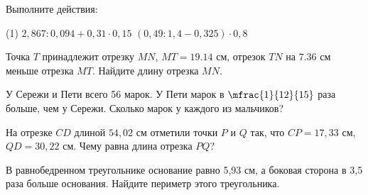 \begin{homework}[number=2]
	\begin{listofex}
		\item Выполните действия: \begin{tasks}(1)
			\task \( 2,867:0,094+0,31\cdot0,15 \)
			\task \( (0,49:1,4-0,325)\cdot0,8 \)
		\end{tasks}
		\item Точка \( T \) принадлежит отрезку \( MN \), \( MT = 19.14 \) см, отрезок \( TN \) на \( 7.36 \) см меньше отрезка \( MT \). Найдите длину отрезка \( MN \).
		\item У Сережи и Пети всего 56 марок. У Пети марок в \( \mfrac{1}{12}{15} \) раза больше, чем у Сережи. Сколько марок у каждого из мальчиков?
		\item На отрезке \( CD \) длиной \( 54,02 \) см отметили точки \( P \) и \( Q \) так, что \( CP = 17,33 \) см, \( QD = 30,22 \) см. Чему равна длина отрезка \( PQ \)?
		\item В равнобедренном треугольнике основание равно 5,93 см, а боковая сторона в 3,5 раза больше основания. Найдите периметр этого треугольника.
	\end{listofex}
\end{homework}


